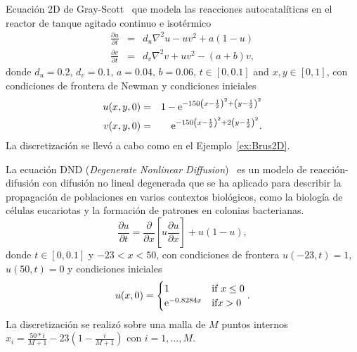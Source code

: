 \begin{example}\label{ex:GS2D}
    Ecuación 2D de Gray-Scott~\cite{gray1984autocatalytic,tokman2012new} que modela las reacciones autocatalíticas en el reactor de tanque agitado continuo e isotérmico
    \begin{eqnarray*}
        \frac{\partial u}{\partial t} &=& d_u\nabla^{2}u -uv^{2}+a(1-u) \\
        \frac{\partial v}{\partial t} &=& d_v\nabla^{2}v +uv^{2}-(a+b)v,
    \end{eqnarray*}
    donde $d_u=0\mathord{.}2,\,d_v=0\mathord{.}1,\,a=0\mathord{.}04,\,b=0\mathord{.}06$, $t\in[0, 0\mathord{.}1]$ and $x,y\in[0,1]$, con condiciones de frontera de Newman y condiciones iniciales
    \begin{eqnarray*}
        u(x,y,0) & = & 1-\mathrm{e}^{-150\left(x-\frac{1}{2}\right)^{2}+\left(y-\frac{1}{2}\right)^{2}}\\
        v(x,y,0) & = & \mathrm{e}^{-150\left(x-\frac{1}{2}\right)^{2}+2\left(y-\frac{1}{2}\right)^{2}}.
    \end{eqnarray*}
    La discretización se llevó a cabo como en el Ejemplo~\ref{ex:Brus2D}.
\end{example}

\begin{example}
    La ecuación DND (\emph{Degenerate Nonlinear Diffusion})~\cite{sherratt2010form,tokman2013comparative} es un modelo de reacción-difusión con difusión no lineal degenerada que se ha aplicado para describir la propagación de poblaciones en varios contextos biológicos, como la biología de células eucariotas y la formación de patrones en colonias bacterianas.
    \[ \frac{\partial u}{\partial t} = \frac{\partial}{\partial x}\left[ u\frac{\partial u}{\partial x} \right] + u(1-u), \]
    donde $t\in[0, 0\mathord{.}1]$ y $-23 < x < 50$, con condiciones de frontera $u(-23,t) = 1$, $u(50,t)=0$ y condiciones iniciales
    \[ u(x,0)=\begin{cases}
    1 & \text{if }x\leq 0\\
    \mathrm{e}^{-0\mathord{.}8284x} & \text{if}x>0
    \end{cases}. \]
    La discretización se realizó sobre una malla de $M$ puntos internos $x_i=\frac{50*i}{M+1}-23\left(1-\frac{i}{M+1}\right)$ con $i=1,\ldots,M$.
\end{example}


